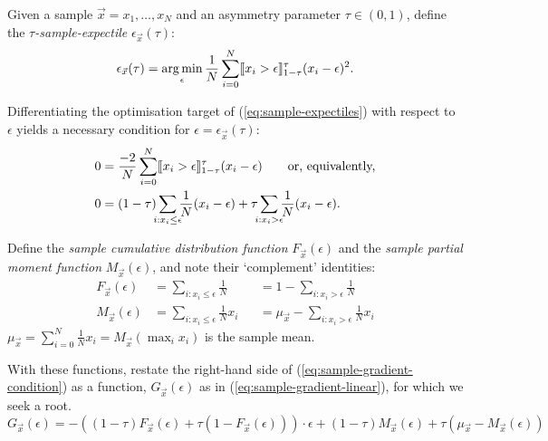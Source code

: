 \documentclass{article}
\DeclareMathOperator*{\argmin}{arg\,min}
\DeclarePairedDelimiter{\iv}{[\hspace{-1.5pt}[}{]\hspace{-1.5pt}]}
\newcommand{\expt}[2]{\epsilon_{#1}{(#2)}}
\begin{document}
Given a sample $\vec x = x_1, \ldots, x_N$
and an asymmetry parameter $\tau \in (0, 1)$,
define the \emph{$\tau$-sample-expectile} $\expt{\vec x}{\tau}$:
\begin{equation}
    \label{eq:sample-expectiles}
    \expt{\vec x}{\tau}
    =
    \argmin_\epsilon
    \frac{1}{N}
    \sum_{i=0}^{N}
        \iv{x_i > \epsilon}^{\tau}_{1-\tau}
        (x_i-\epsilon)^2.
\end{equation}

Differentiating the optimisation target of (\ref{eq:sample-expectiles})
with respect to $\epsilon$
yields a necessary condition for $\epsilon = \expt{\vec x}{\tau}$:
\begin{align}
    \notag
    0
    &=
    \frac{-2}{N}
    \sum_{i=0}^{N}
        \iv{x_i > \epsilon}^{\tau}_{1-\tau}
        (x_i-\epsilon)
    \qquad\text{or, equivalently,}
    \\
    \label{eq:sample-gradient-condition}
    0&=
    (1-\tau)
    \smashoperator{\sum_{i : x_i \leq \epsilon}}
        \frac1N
        (x_i-\epsilon)
    +\tau
    \smashoperator{\sum_{i : x_i > \epsilon}}
        \frac1N
        (x_i-\epsilon).
\end{align}

Define the
\emph{sample cumulative distribution function}
$F_{\vec x}(\epsilon)$
and the \emph{sample partial moment function}
$M_{\vec x}(\epsilon)$,
and note their `complement' identities:
\begin{align}
\label{eq:sample-cdf-compl}
F_{\vec x}(\epsilon)
& =
{\sum_{i:x_i\leq \epsilon}} \frac{1}{N}
&
& =
1 - {\sum_{i:x_i > \epsilon}} \frac{1}{N}
\\
\label{eq:sample-pmf-compl}
M_{\vec x}(\epsilon)
& =
{\sum_{i:x_i\leq \epsilon}} \frac{1}{N} x_i
&
& =
\mu_{\vec x} - {\sum_{i:x_i > \epsilon}} \frac{1}{N} x_i
\end{align}
$
\mu_{\vec x}
= \sum_{i=0}^N \frac{1}{N} x_i
= M_{\vec x}(\max_i x_i)
$
is the sample mean.

With these functions, restate the right-hand side of
(\ref{eq:sample-gradient-condition})
as a function, $G_{\vec x}(\epsilon)$
as in (\ref{eq:sample-gradient-linear}),
for which we seek a root.
\begin{equation}
\label{eq:sample-gradient-linear}
G_{\vec x}(\epsilon) = 
- ((1-\tau) F_{\vec x}(\epsilon) + \tau(1-F_{\vec x}(\epsilon)))
\cdot \epsilon
+ (1-\tau) M_{\vec x}(\epsilon)
+ \tau (\mu_{\vec x} - M_{\vec x}(\epsilon)) 
\end{equation}
\end{document}
